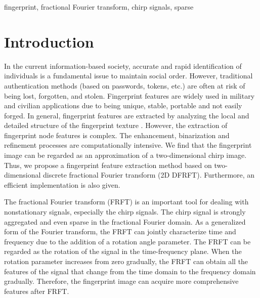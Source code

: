\documentclass[conference]{IEEEtran}
\begin{document}
\begin{IEEEkeywords}
fingerprint, fractional Fourier transform, chirp signals, sparse
\end{IEEEkeywords}

\section{Introduction}
 
 
In the current information-based society, accurate and rapid identification of individuals is a fundamental issue to maintain social order. However, traditional authentication methods (based on passwords, tokens, etc.) are often at risk of being lost, forgotten, and stolen. Fingerprint features \cite{b9} are widely used in military and civilian applications due to being unique, stable, portable and not easily forged. In general, fingerprint features are extracted by analyzing the local and detailed structure of the fingerprint texture \cite{Sun2022,Mehboob2022,Kumar2022}. However, the extraction of fingerprint node features is complex. The enhancement, binarization and refinement processes are computationally intensive. We find that the fingerprint image can be regarded as an approximation of a two-dimensional chirp image. Thus, we propose a fingerprint feature extraction method based on two-dimensional discrete fractional Fourier transform (2D DFRFT). Furthermore, an efficient implementation is also given.

The fractional Fourier transform (FRFT) \cite{b6} is an important tool for dealing with nonstationary signals, especially the chirp signals. The chirp signal is strongly aggregated and even sparse in the fractional Fourier domain. As a generalized form of the Fourier transform, the FRFT can jointly characterize time and frequency due to the addition of a rotation angle parameter. The FRFT can be regarded as the rotation of the signal in the time-frequency plane. When the rotation parameter increases from zero gradually, the FRFT can obtain all the features of the signal that change from the time domain to the frequency domain gradually. Therefore, the fingerprint image can acquire more comprehensive features after FRFT.
\end{document}
